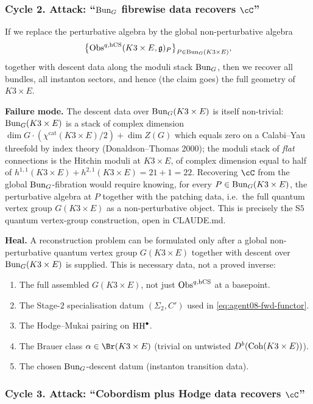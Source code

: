 \subsubsection{Cycle 2. Attack: ``$\mathrm{Bun}_G$ fibrewise data recovers $\cC$''}

If we replace the perturbative algebra by the global non-perturbative
algebra
\[
\bigl\{\mathrm{Obs}^{q,\mathrm{hCS}}(K3\times E,\mathfrak{g})_{P}\bigr\}_{P\in\mathrm{Bun}_G(K3\times E)},
\]
together with descent data along the moduli stack $\mathrm{Bun}_G$, then we
recover all bundles, all instanton sectors, and hence (the claim
goes) the full geometry of $K3\times E$.

\textbf{Failure mode.} The descent data over $\mathrm{Bun}_G(K3\times E)$ is itself
non-trivial: $\mathrm{Bun}_G(K3\times E)$ is a stack of complex dimension
$\dim G\cdot(\chi^{\mathrm{cat}}(K3\times E)/2)+\dim Z(G)$ which equals
zero on a Calabi--Yau threefold by index theory (Donaldson--Thomas
2000); the moduli stack of \emph{flat} connections is the Hitchin
moduli at $K3\times E$, of complex dimension equal to half of
$h^{1,1}(K3\times E)+h^{2,1}(K3\times E)= 21+1=22$. Recovering $\cC$
from the global $\mathrm{Bun}_G$-fibration would require knowing, for every
$P\in\mathrm{Bun}_G(K3\times E)$, the perturbative algebra at $P$ together with
the patching data, i.e.\ the full quantum vertex group
$G(K3\times E)$ as a non-perturbative object. This is precisely the S$5$
quantum vertex-group construction, open in CLAUDE.md.

\textbf{Heal.} A reconstruction problem can be formulated only after a
global non-perturbative quantum vertex group $G(K3\times E)$ together
with descent over $\mathrm{Bun}_G(K3\times E)$ is supplied. This is necessary
data, not a proved inverse:
\begin{enumerate}[label=\textup{(D\arabic*)}]
 \item The full assembled $G(K3\times E)$, not just $\mathrm{Obs}^{q,\mathrm{hCS}}$ at
 a basepoint.
 \item The Stage-$2$ specialisation datum $(\Sigma_2,C')$ used in
 \eqref{eq:agent08-fwd-functor}.
 \item The Hodge--Mukai pairing on $\mathrm{HH}^\bullet$.
 \item The Brauer class $\alpha\in\Br(K3\times E)$ (trivial on
 untwisted $D^b(\mathrm{Coh}(K3\times E))$).
 \item The chosen $\mathrm{Bun}_G$-descent datum (instanton transition data).
\end{enumerate}

\subsubsection{Cycle 3. Attack: ``Cobordism plus Hodge data recovers $\cC$''}

